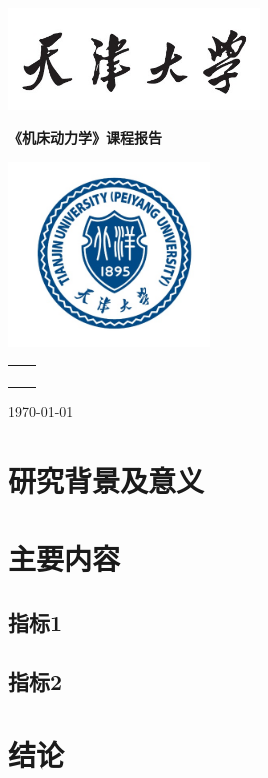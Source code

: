 \documentclass[10pt]{article}
\begin{document}
	\begin{titlepage}
		\centering
		\vspace*{-2cm}
		\includegraphics[width=0.5\textwidth]{tju_1.png}\par
		\vspace{0.5cm}
		\begin{center}
			\erhao \textbf{《机床动力学》课程报告}
		\end{center}
		\vspace{1cm}
		\includegraphics[width=0.4\textwidth]{tju_2}\par
		\begin{center}
			\erhao \hei {}
		\end{center}
		\vspace{3cm}
		\begin{center}
		\song\sihao
		\renewcommand\arraystretch{1.5}
		\begin{tabular}{p{2cm}c}
			\makebox[2em][l]{学\qquad 院：}& \underline{\makebox[6em][l]{机械工程学院}} \\
			\makebox[2em][l]{专\qquad 业：} & \underline{\makebox[6em][l]{机械工程}} \\
			\makebox[2em][l]{姓\qquad 名：}&\underline{\makebox[6em][l]{张三}}\\
			\makebox[2em][l]{学\qquad 号：}&\underline{\makebox[6em][l]{1017201000}}\\
		\end{tabular}
	
	\vspace{3cm}
	\today
		\end{center}
	\end{titlepage}

\newpage
\xiaosihao
\tableofcontents
\thispagestyle{empty}
\clearpage
\setcounter{page}{1}

\section{研究背景及意义}
\lipsum[1]
\section{主要内容}
\subsection{指标1}
\lipsum[2]
\subsection{指标2}
\lipsum[3]
\section{结论}
\lipsum[4]
\end{document}
